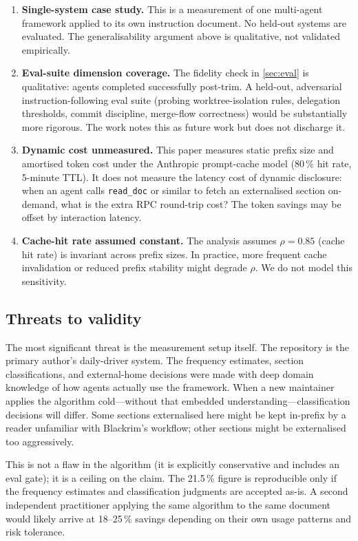 \begin{enumerate}
  \item \textbf{Single-system case study.} This is a measurement of one
    multi-agent framework applied to its own instruction document. No
    held-out systems are evaluated. The generalisability argument above
    is qualitative, not validated empirically.
  \item \textbf{Eval-suite dimension coverage.} The fidelity check in
    \cref{sec:eval} is qualitative: agents completed successfully post-trim.
    A held-out, adversarial instruction-following eval suite (probing
    worktree-isolation rules, delegation thresholds, commit discipline,
    merge-flow correctness) would be substantially more rigorous. The work
    notes this as future work but does not discharge it.
  \item \textbf{Dynamic cost unmeasured.} This paper measures static
    prefix size and amortised token cost under the Anthropic prompt-cache
    model (80\,\% hit rate, 5-minute TTL). It does not measure the latency
    cost of dynamic disclosure: when an agent calls \texttt{read\_doc}
    or similar to fetch an externalised section on-demand, what is the
    extra RPC round-trip cost? The token savings may be offset by
    interaction latency.
  \item \textbf{Cache-hit rate assumed constant.} The analysis assumes
    $\rho = 0.85$ (cache hit rate) is invariant across prefix sizes.
    In practice, more frequent cache invalidation or reduced prefix
    stability might degrade $\rho$. We do not model this sensitivity.
\end{enumerate}

\subsection{Threats to validity}

The most significant threat is the measurement setup itself. The
\blackrim repository is the primary author's daily-driver system. The
frequency estimates, section classifications, and external-home decisions
were made with deep domain knowledge of how agents actually use the
framework. When a new maintainer applies the algorithm cold---without
that embedded understanding---classification decisions will differ. Some
sections externalised here might be kept in-prefix by a reader unfamiliar
with Blackrim's workflow; other sections might be externalised too
aggressively.

This is not a flaw in the algorithm (it is explicitly conservative and
includes an eval gate); it is a ceiling on the claim. The 21.5\,\% figure
is reproducible only if the frequency estimates and classification judgments
are accepted as-is. A second independent practitioner applying the
same algorithm to the same document would likely arrive at 18--25\,\% savings
depending on their own usage patterns and risk tolerance.
